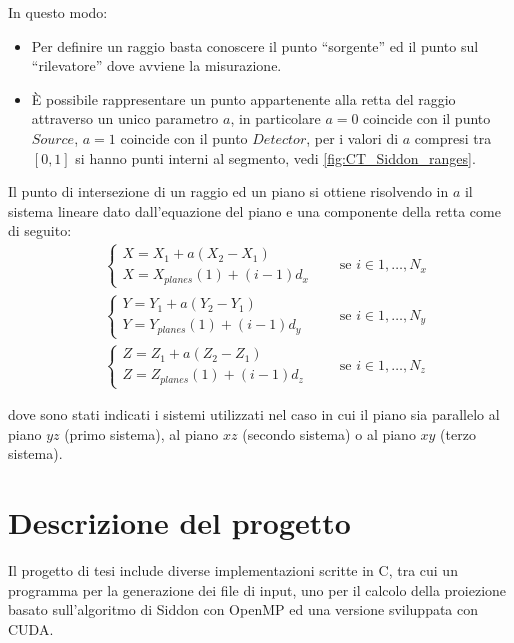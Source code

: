 \documentclass[12pt,a4paper]{report}
\begin{document}
In questo modo:
\begin{itemize}
  \item Per definire un raggio basta conoscere il punto ``sorgente'' ed il punto sul ``rilevatore'' dove avviene la misurazione.
  \item È possibile rappresentare un punto appartenente alla retta del raggio attraverso un unico parametro \(a\), in particolare
        \(a = 0\) coincide con il punto \(Source\), \(a = 1\) coincide con il punto \(Detector\), per i valori di \(a\) compresi
        tra \([0, 1]\) si hanno punti interni al segmento, vedi \autoref{fig:CT_Siddon_ranges}.
\end{itemize}

Il punto di intersezione di un raggio ed un piano si ottiene risolvendo in \(a\) il sistema lineare dato dall'equazione del
piano e una componente della retta come di seguito:
\begin{equation}
  \begin{aligned}
    &\begin{cases}
      X = X_1 + a (X_2 - X_1) \\
      X = X_{planes}(1) + (i - 1) d_x
    \end{cases} \quad &\text{se } i \in 1, \dots, N_x \\
    &\begin{cases}
      Y = Y_1 + a (Y_2 - Y_1) \\
      Y = Y_{planes}(1) + (i - 1) d_y
    \end{cases} \quad &\text{se } i \in 1, \dots, N_y \\
    &\begin{cases}
      Z = Z_1 + a (Z_2 - Z_1) \\
      Z = Z_{planes}(1) + (i - 1) d_z
    \end{cases} \quad &\text{se } i \in 1, \dots, N_z
  \end{aligned} \nonumber
\end{equation}

dove sono stati indicati i sistemi utilizzati nel caso in cui il piano sia parallelo al piano \(yz\) (primo sistema), al piano
\(xz\) (secondo sistema) o al piano \(xy\) (terzo sistema).

\chapter{Descrizione del progetto} \label{chap:proj}

Il progetto di tesi include diverse implementazioni scritte in C, tra cui un programma per la generazione dei file di input, uno
per il calcolo della proiezione basato sull'algoritmo di Siddon con OpenMP ed una versione sviluppata con CUDA.
\end{document}
